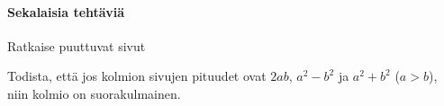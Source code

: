 \begin{tehtavasivu}
\paragraph*{Sekalaisia tehtäviä}

\begin{tehtava}
	Ratkaise puuttuvat sivut
	\begin{alakohdat}
	\end{alakohdat}
	\begin{vastaus}
		\begin{alakohdat}
			\alakohta{$5$}
			\alakohta{$\sqrt{5}$}
			\alakohta{$1$}
			\alakohta{$2\sqrt{2}$}
		\end{alakohdat}
	\end{vastaus}
\end{tehtava}

\begin{tehtava}
Todista, että jos kolmion sivujen pituudet ovat $2ab$, $a^2-b^2$ ja $a^2+b^2$ ($a>b$), niin kolmio on suorakulmainen.
\end{tehtava}
\end{tehtavasivu}


